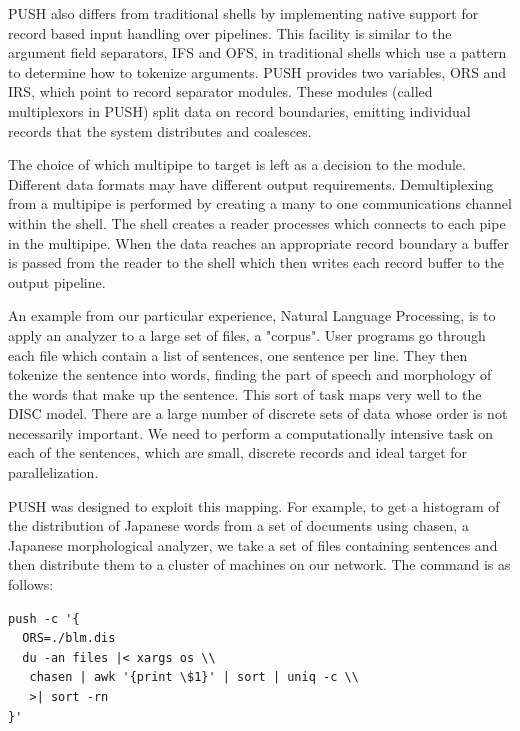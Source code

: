 \documentclass{sig-alt-release2}
\begin{document}
PUSH also differs from traditional shells by implementing native support for 
record based input handling over pipelines. This facility is similar to the 
argument field separators, IFS and OFS, in traditional shells which use a 
pattern to determine how to tokenize arguments. PUSH provides two variables, 
ORS and IRS, which point to record separator modules. These modules 
(called multiplexors in PUSH) split data on record boundaries, emitting 
individual records that the system distributes and coalesces. 

The choice of which multipipe to target is left as a decision to the module. 
Different data formats may have different output requirements. 
Demultiplexing from a multipipe is performed by creating a many to one 
communications channel within the shell. The shell creates a reader processes 
which connects to each pipe in the multipipe. When the data reaches an 
appropriate record boundary a buffer is passed from the reader to the shell 
which then writes each record buffer to the output pipeline. 

An example from our particular experience, Natural Language Processing, is 
to apply an analyzer to a large set of files, a "corpus". User programs go 
through each file which contain a list of sentences, one sentence per line. 
They then tokenize the sentence into words, finding the part of speech and 
morphology of the words that make up the sentence.
This sort of task maps very well to the DISC model. There are a large number of 
discrete sets of data whose order is not necessarily important. We need to 
perform a computationally intensive task on each of the sentences, which are 
small, discrete records and ideal target for parallelization. 

PUSH was designed to exploit this mapping. For example, to get a histogram of 
the distribution of Japanese words from a set of documents using chasen, 
a Japanese morphological analyzer, we take a set of files containing sentences 
and then distribute them to a cluster of machines on our network. The command 
is as follows:

\begin{verbatim}
push -c '{
  ORS=./blm.dis
  du -an files |< xargs os \\
   chasen | awk '{print \$1}' | sort | uniq -c \\
   >| sort -rn
}'
\end{verbatim}
\end{document}

